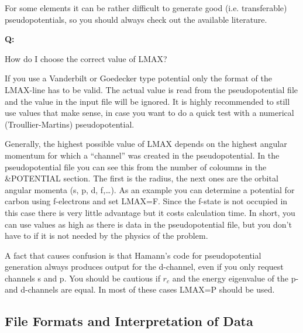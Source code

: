 \documentclass[twoside,10pt,titlepage,a4paper]{article}
\newcommand{\reflabel}[1]{\hypertarget{#1}}
\newcommand{\reflabel}[1]{\label{#1}}
\newcommand{\faqquestion}[1]{\vspace{2ex}\reflabel{faq#1}{{\bf Q:\ }}}
\newcommand{\faqanswer}{\vspace{1ex}{{\bf A:\ }}}
\begin{document}
For some elements it can
be rather difficult to generate good (i.e. transferable) pseudopotentials,
so you should always check out the available literature.

\faqquestion{whichLMAX}
How do I choose the correct value of LMAX?

\faqanswer
If you use a Vanderbilt or Goedecker type potential only the format of
the LMAX-line has to be valid. The actual value is read from the
pseudopotential file and the value in the input file will be ignored.
It is highly recommended to still use values that make sense, in case you want
to do a quick test with a numerical (Troullier-Martins) pseudopotential.

Generally, the highest  possible value of LMAX depends on the highest
angular momentum for which a ``channel'' was created in the pseudopotential.
In the pseudopotential file you can see this from the number of coloumns
in the \&POTENTIAL section. The first is the radius, the next ones are
the orbital angular momenta (s, p, d, f,\ldots).
As an example you can determine a potential for carbon using f-electrons
and set LMAX=F. Since the f-state is not occupied in this case there is
very little advantage but it costs calculation time. In short, you can use values
as high as there is data in the pseudopotential file, but you don't have to
if it is not needed by the physics of the problem.

A fact that causes confusion is that Hamann's code for pseudopotential
generation always produces output for the d-channel, even if you only
request channels s and p. You should be cautious if $r_{c}$ and the
energy eigenvalue of the p- and d-channels are equal. In most of these
cases LMAX=P should be used.

\subsection{File Formats and Interpretation of Data}
\label{sec:file-formats}
\end{document}

